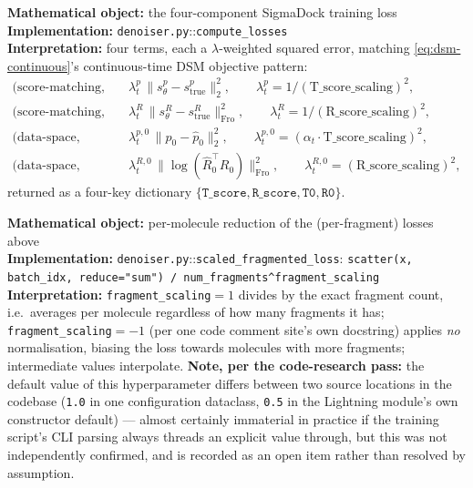 \documentclass[11pt,a4paper]{report}
\theoremstyle{definition}
\theoremstyle{remark}
\newcommand{\file}[1]{\texttt{#1}}
\newcommand{\pyfunc}[1]{\texttt{#1}}
\begin{document}
\begin{codebox}
\textbf{Mathematical object:} the four-component SigmaDock training loss \\
\textbf{Implementation:} \file{denoiser.py}::\pyfunc{compute\_losses} \\
\textbf{Interpretation:} four terms, each a $\lambda$-weighted squared
error, matching \eqref{eq:dsm-continuous}'s continuous-time DSM objective
pattern:
\begin{align*}
\text{(score-matching, translation)}&\quad
\lambda^p_t\,\bigl\|s^p_\theta - s^p_{\mathrm{true}}\bigr\|_2^2,
\qquad
\lambda^p_t = 1/(\text{T\_score\_scaling})^2,\\
\text{(score-matching, rotation)}&\quad
\lambda^R_t\,\bigl\|s^R_\theta - s^R_{\mathrm{true}}\bigr\|_{\mathrm{Fro}}^2,
\qquad
\lambda^R_t = 1/(\text{R\_score\_scaling})^2,\\
\text{(data-space, translation)}&\quad
\lambda^{p,0}_t\,\|p_0-\widehat p_0\|_2^2,
\qquad
\lambda^{p,0}_t = (\alpha_t\cdot\text{T\_score\_scaling})^2,\\
\text{(data-space, rotation)}&\quad
\lambda^{R,0}_t\,\bigl\|\log(\widehat R_0^\top R_0)\bigr\|_{\mathrm{Fro}}^2,
\qquad
\lambda^{R,0}_t = (\text{R\_score\_scaling})^2 ,
\end{align*}
returned as a four-key dictionary $\{\texttt{T\_score},\texttt{R\_score},\texttt{T0},\texttt{R0}\}$.
\end{codebox}

\begin{codebox}
\textbf{Mathematical object:} per-molecule reduction of the (per-fragment)
losses above \\
\textbf{Implementation:} \file{denoiser.py}::\pyfunc{scaled\_fragmented\_loss}:
\texttt{scatter(x, batch\_idx, reduce="sum") / num\_fragments\textasciicircum{}fragment\_scaling} \\
\textbf{Interpretation:} \texttt{fragment\_scaling}$=1$ divides by the exact
fragment count, i.e.\ averages per molecule regardless of how many
fragments it has; \texttt{fragment\_scaling}$=-1$ (per one code comment
site's own docstring) applies \emph{no} normalisation, biasing the loss
towards molecules with more fragments; intermediate values interpolate.
\textbf{Note, per the code-research pass:} the default value of this
hyperparameter differs between two source locations in the codebase
(\texttt{1.0} in one configuration dataclass, \texttt{0.5} in the Lightning
module's own constructor default) --- almost certainly immaterial in
practice if the training script's CLI parsing always threads an explicit
value through, but this was not independently confirmed, and is recorded
as an open item rather than resolved by assumption.
\end{codebox}
\end{document}
